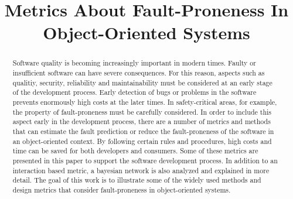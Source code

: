 \documentclass[conference]{IEEEtran}
\begin{document}
\title{Metrics About Fault-Proneness In Object-Oriented Systems}

\author{
}

% 

\maketitle

\begin{abstract}
	Software quality is becoming increasingly important in modern times. Faulty or insufficient software can have severe consequences. For this reason, aspects such as qualitiy, security, reliability and maintainability must be considered at an early stage of the development process. Early detection of bugs or problems in the software prevents enormously high costs at the later times. In safety-critical areas, for example, the property of fault-proneness must be carefully considered. In order to include this aspect early in the development process, there are a number of metrics and methods that can estimate the fault prediction or reduce the fault-proneness of the software in an object-oriented context. By following certain rules and procedures, high costs and time can be saved for both developers and consumers. Some of these metrics are presented in this paper to support the software development process. In addition to an interaction based metric, a bayesian network is also analyzed and explained in more detail.
	The goal of this work is to illustrate some of the widely used methods and design metrics that consider fault-proneness in object-oriented systems.
	
	
\end{abstract}









%



\end{document}
